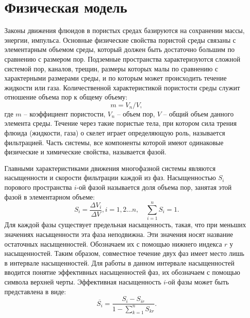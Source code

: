 \section{Физическая модель}

Законы движения флюидов в пористых средах базируются на сохранении
массы, энергии, импульса. Основные
физические свойства пористой среды связаны с элементарным
объемом среды, который должен быть достаточно большим по сравнению с размером
пор. Подземные пространства характеризуются сложной системой пор, каналов,
трещин, размеры которых малы по сравнению с характерными размерами среды, и по
которым может происходить течение жидкости или газа. Количественной
характеристикой пористости среды
служит отношение объема пор к общему объему:
%
	$$m=V_n/V,$$
%	 	
где $m$ -- коэффициент пористости, $V_n$ -- объем пор, $V$ -- общий объем
данного
элемента среды.
%
Течение через такие пористые тела, при котором сила трения флюида
(жидкости, газа) о скелет играет определяющую роль, называется фильтрацией.
Часть системы, все компоненты которой имеют
одинаковые физические и химические свойства, называется фазой. 

Главными характеристиками движения многофазной системы являются насыщенности и
скорости фильтрации каждой из фаз. Насыщенностью $S_i$  порового пространства
$i$-ой фазой называется доля объема пор, занятая этой фазой в элементарном
объеме:
%
\begin{equation} 
S_i=\frac{\Delta V_i}{\Delta V}, i=1,2\ldots n,{\quad}\sum_{i=1}^{n}S_i=1. 
\end{equation}
%
Для каждой фазы существует предельная насыщенность, такая, что при меньших
значениях насыщенности эта фаза неподвижна. Эти значения носят название остаточных 
насыщенностей. Обозначаем их с помощью нижнего индекса $r$ у насыщенностей. Таким 
образом, совместное течение двух фаз имеет место лишь в интервале насыщенностей.
Для работы в данном интервале насыщенностей вводится понятие эффективных 
насыщенностей фаз, их обозначаем с помощью символа верхней черты. Эффективная насыщенность 
$i$-ой фазы может быть представлена в виде:
$$\overline{S_i}={\frac{S_i-S_{ir}}{1-\sum\limits_{k=1}^{n}S_{kr}}}.$$


